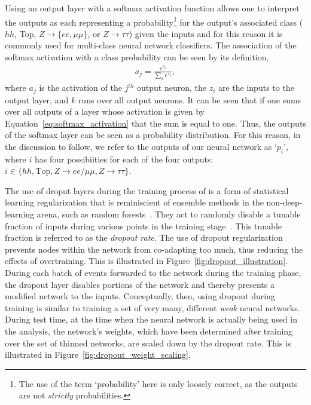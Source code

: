Using an output layer with a softmax activation function allows one to interpret the outputs as
each representing a probability\footnote{The use of the term `probability' here is only
loosely correct, as the outputs are not \textit{strictly} probabilities.}
for the output's associated class ($hh$, Top, $Z \rightarrow \{ee,\mu\mu\}$,
or $Z \rightarrow \tau\tau$) given the inputs and for this reason it is commonly used for multi-class
neural network classifiers.
The association of the softmax activation with a class probability can be seen by its definition,
\begin{align}
    a_j = \frac{ e^{z_j} } { \sum\limits_k e ^{z_k} },
    \label{eq:softmax_activation}
\end{align}
where $a_j$ is the activation of the $j^{th}$ output neuron, the $z_i$ are the inputs to the output layer,
and $k$ runs over all output neurons.
It can be seen that if one sums over all outputs of a layer whose activation is given by Equation~\ref{eq:softmax_activation}
that the sum is equal to one.
Thus, the outputs of the softmax layer can be seen as a probability distribution.
For this reason, in the discussion to follow, we refer to the outputs of our neural network as `$p_i$',
where $i$ has four possibiities for each of the four outputs: $i \in \{ hh, \text{Top}, Z\rightarrow ee/\mu\mu, Z\rightarrow \tau\tau \}$.

The use of droput layers during the training process of is a form of statistical learning regularization that is reminiscient
of ensemble methods in the non-deep-learning arena, such as random forests~\cite{RandomForestsBreiman2001}.
They act to randomly disable a tunable fraction of inputs during various points in the training stage~\cite{JMLRDropout}.
This tunable fraction is referred to as the \textit{dropout rate}.
The use of dropout regularization prevents nodes within the network from co-adapting too much, thus reducing
the effects of overtraining.
This is illustrated in Figure~\ref{fig:dropout_illustration}.
During each batch of events forwarded to the network during the training phase, the dropout layer disables
portions of the network and thereby presents a modified network to the inputs.
Conceptually, then, using dropout during training is similar to training a set of very many, different \textit{weak}
neural networks.
During test time, at the time when the neural network is actually being used in the analysis,
the network's weights, which have been determined after training over the set of thinned networks,
are scaled down by the dropout rate.
This is illustrated in Figure~\ref{fig:dropout_weight_scaling}.

